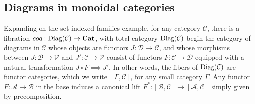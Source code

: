 \subsection{Diagrams in monoidal categories}
Expanding on the set indexed families example, for any category $\mathcal{C}$, there is a fibration $cod : \operatorname{\text{Diag}}(\mathcal{C}) \to \mathbf{Cat}$, with total category $\operatorname{\text{Diag}}(\mathcal{C})$ begin the category of diagrams in $\mathcal{C}$ whose objects are functors $J : \mathcal{D} \to \mathcal{C}$, and whose morphisms between $J : \mathcal{D} \to \mathcal{V}$ and $J' :\mathcal{C} \to \mathcal{V}$ consist of functors $F : \mathcal{C} \to \mathcal{D}$ equipped with a natural transformation $J \circ F \implies J'$. In other words, the fibers of $\operatorname{\text{Diag}}(\mathcal{C})$ are functor categories, which we write $[\Gamma, \mathcal{C}]$, for any small category $\Gamma$. Any functor $F : \mathcal{A} \to \mathcal{B}$ in the base induces a canonical lift $F^* : [\mathcal{B}, \mathcal{C}] \to [\mathcal{A},\mathcal{C}]$ simply given by precomposition.


